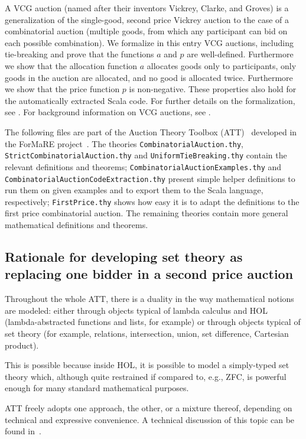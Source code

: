 \documentclass[11pt,a4paper]{article}
\begin{document}
A VCG auction (named after their inventors Vickrey, Clarke, and
Groves) is a generalization of the single-good, second price Vickrey
auction to the case of a combinatorial auction (multiple goods, from
which any participant can bid on each possible combination). We
formalize in this entry VCG auctions, including tie-breaking and prove
that the functions $a$ and $p$ are well-defined. Furthermore we show
that the allocation function $a$ allocates goods only to participants,
only goods in the auction are allocated, and no good is allocated
twice. Furthermore we show that the price function $p$ is
non-negative. These properties also hold for the automatically
extracted Scala code. For further details on the formalization, see
\cite{ec15}. For background information on VCG auctions, see \cite{cramton}.

  
The following files are part of the Auction Theory Toolbox
(ATT)~\cite{github} developed in the ForMaRE project~\cite{formare}.
The theories \texttt{CombinatorialAuction.thy},
\texttt{StrictCombinatorialAuction.thy} and
\texttt{UniformTieBreaking.thy} contain the relevant definitions and
theorems; \texttt{CombinatorialAuctionExamples.thy} and
\texttt{CombinatorialAuctionCodeExtraction.thy} present simple helper
definitions to run them on given examples and to export
them to the Scala language, respectively; \texttt{FirstPrice.thy}
shows how easy it is to adapt the definitions to the first price
combinatorial auction.  The remaining theories contain more general
mathematical definitions and theorems.


\subsection{Rationale for developing set theory as replacing one bidder in a second price auction}

Throughout the whole ATT, there is a duality in the way mathematical
notions are modeled: either through objects typical of lambda calculus
and HOL (lambda-abstracted functions and lists, for example) or
through objects typical of set theory (for example, relations,
intersection, union, set difference, Cartesian product).

This is possible because inside HOL, it is possible to model a
simply-typed set theory which, although quite restrained if compared
to, e.g., ZFC, is powerful enough for many standard mathematical
purposes.

ATT freely adopts one approach, the other, or a mixture thereof, depending on technical and
expressive convenience.
A technical discussion of this topic can be found in~\cite{cicm2014}.
\end{document}
